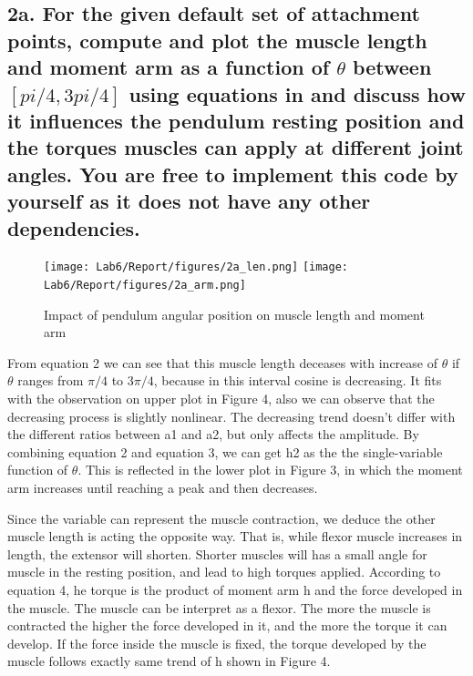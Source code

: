 \documentclass{cmc}
\begin{document}
\label{sec:questions}

\subsection*{2a. For the given default set of attachment points,
  compute and plot the muscle length and moment arm as a function of
  $\theta$ between $[pi/4, 3pi/4]$ using equations in
   and discuss how it influences the pendulum
  resting position and the torques muscles can apply at different
  joint angles. You are free to implement this code by yourself as it
  does not have any other dependencies.}
\label{sec:2a}


\begin{figure}[H]
  \centering
  \texttt{[image: Lab6/Report/figures/2a\_len.png]}
  \texttt{[image: Lab6/Report/figures/2a\_arm.png]}
  \caption{Impact of pendulum angular position on  muscle length and moment arm  }
  \label{2a}
\end{figure}


From equation 2 we can see that this muscle length deceases with increase of $\theta$ if $\theta$ ranges from $\pi/4$ to $3\pi/4$, because in this interval cosine is decreasing. It fits with the observation on upper plot in Figure 4, also we can observe that the decreasing process is slightly nonlinear. The decreasing trend doesn't differ with the different ratios between a1 and a2, but only affects the amplitude. By combining equation 2 and equation 3, we can get h2 as the the single-variable function of $\theta$. This is reflected in the lower plot in Figure 3, in which the moment arm increases until reaching a peak and then decreases.


Since the variable can represent the muscle contraction, we deduce the other muscle length is acting the opposite way. That is, while flexor muscle increases in length, the extensor will shorten. Shorter muscles will has a small angle for muscle in the resting position, and lead to high torques applied.
According to equation 4, he torque is the product of moment arm h and the force developed in the muscle. 
The muscle can be interpret as a flexor. The more the muscle is contracted the higher the force developed in it, and the more the torque it can develop. If the force inside the muscle is fixed, the torque developed by the muscle follows exactly same trend of h shown in Figure 4.

\end{document}
